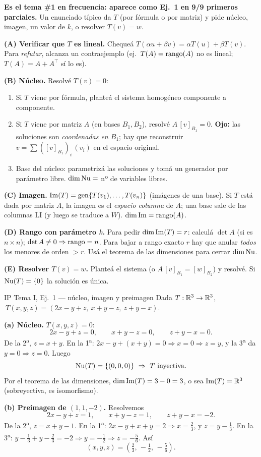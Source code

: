 \begin{receta}
\textbf{Es el tema \#1 en frecuencia: aparece como Ej.\ 1 en 9/9 primeros parciales.} Un enunciado típico da $T$ (por fórmula o por matriz) y pide núcleo, imagen, un valor de $k$, o resolver $T(v)=w$.

\smallskip
\textbf{(A) Verificar que $T$ es lineal.} Chequeá $T(\alpha u+\beta v)=\alpha T(u)+\beta T(v)$. Para \emph{refutar}, alcanza un contraejemplo (ej.\ $T(A)=\operatorname{rango}(A)$ no es lineal; $T(A)=A+A^\top$ sí lo es).

\smallskip
\textbf{(B) Núcleo.} Resolvé $T(v)=0$:
\begin{enumerate}
\item Si $T$ viene por fórmula, planteá el sistema homogéneo componente a componente.
\item Si $T$ viene por matriz $A$ (en bases $B_1,B_2$), resolvé $A\,[v]_{B_1}=0$. \textbf{Ojo:} las soluciones son \emph{coordenadas en $B_1$}; hay que reconstruir $v=\sum([v]_{B_1})_i\,(v_i)$ en el espacio original.
\item Base del núcleo: parametrizá las soluciones y tomá un generador por parámetro libre. $\dim\operatorname{Nu}=$ nº de variables libres.
\end{enumerate}

\smallskip
\textbf{(C) Imagen.} $\operatorname{Im}(T)=\operatorname{gen}\{T(v_1),\dots,T(v_n)\}$ (imágenes de una base). Si $T$ está dada por matriz $A$, la imagen es el \emph{espacio columna} de $A$; una base sale de las columnas LI (y luego se traduce a $W$). $\dim\operatorname{Im}=\operatorname{rango}(A)$.

\smallskip
\textbf{(D) Rango con parámetro $k$.} Para pedir $\dim\operatorname{Im}(T)=r$: calculá $\det A$ (si es $n\times n$); $\det A\neq0\Rightarrow\operatorname{rango}=n$. Para bajar a rango exacto $r$ hay que anular \emph{todos} los menores de orden $>r$. Usá el teorema de las dimensiones para cerrar $\dim\operatorname{Nu}$.

\smallskip
\textbf{(E) Resolver $T(v)=w$.} Planteá el sistema (o $A\,[v]_{B_1}=[w]_{B_2}$) y resolvé. Si $\operatorname{Nu}(T)=\{0\}$ la solución es única.
\end{receta}

\begin{ejemplo}{IP Tema I, Ej.\ 1 --- núcleo, imagen y preimagen}
Dada $T:\mathbb{R}^3\to\mathbb{R}^3$, $\ T(x,y,z)=(2x-y+z,\ x+y-z,\ z+y-x)$.

\smallskip
\textbf{(a) Núcleo.} $T(x,y,z)=0$:
\[
2x-y+z=0,\qquad x+y-z=0,\qquad z+y-x=0.
\]
De la 2\textsuperscript{a}, $z=x+y$. En la 1\textsuperscript{a}: $2x-y+(x+y)=0\Rightarrow x=0\Rightarrow z=y$, y la 3\textsuperscript{a} da $y=0\Rightarrow z=0$. Luego
\[
\Nuc(T)=\{(0,0,0)\}\ \Rightarrow\ T\ \text{inyectiva}.
\]
Por el teorema de las dimensiones, $\dim\operatorname{Im}(T)=3-0=3$, o sea $\operatorname{Im}(T)=\mathbb{R}^3$ (sobreyectiva, es isomorfismo).

\smallskip
\textbf{(b) Preimagen de $(1,1,-2)$.} Resolvemos
\[
2x-y+z=1,\qquad x+y-z=1,\qquad z+y-x=-2.
\]
De la 2\textsuperscript{a}, $z=x+y-1$. En la 1\textsuperscript{a}: $2x-y+x+y=2\Rightarrow x=\tfrac23$, y $z=y-\tfrac13$. En la 3\textsuperscript{a}: $y-\tfrac13+y-\tfrac23=-2\Rightarrow y=-\tfrac12\Rightarrow z=-\tfrac56$. Así
\[
\boxed{(x,y,z)=\left(\tfrac23,\,-\tfrac12,\,-\tfrac56\right).}
\]
\end{ejemplo}

